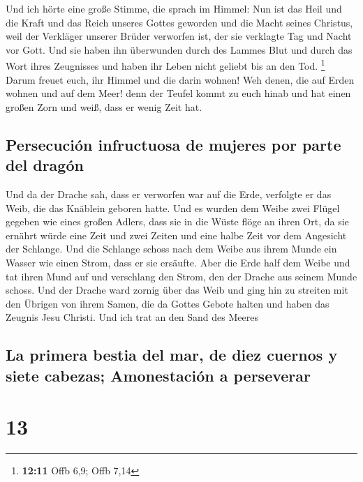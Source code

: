  Und ich hörte eine große Stimme, die sprach im Himmel:
Nun ist das Heil und die Kraft und das Reich unseres Gottes geworden und
die Macht seines Christus, weil der Verkläger unserer Brüder verworfen
ist, der sie verklagte Tag und Nacht vor Gott.  Und sie
haben ihn überwunden durch des Lammes Blut und durch das Wort ihres
Zeugnisses und haben ihr Leben nicht geliebt bis an den Tod. \footnote{\textbf{12:11}
  Offb 6,9; Offb 7,14}  Darum freuet euch, ihr Himmel und
die darin wohnen! Weh denen, die auf Erden wohnen und auf dem Meer! denn
der Teufel kommt zu euch hinab und hat einen großen Zorn und weiß, dass
er wenig Zeit hat.

\hypertarget{persecuciuxf3n-infructuosa-de-mujeres-por-parte-del-draguxf3n}{%
\subsection{Persecución infructuosa de mujeres por parte del
dragón}\label{persecuciuxf3n-infructuosa-de-mujeres-por-parte-del-draguxf3n}}

 Und da der Drache sah, dass er verworfen war auf die
Erde, verfolgte er das Weib, die das Knäblein geboren hatte.
 Und es wurden dem Weibe zwei Flügel gegeben wie eines
großen Adlers, dass sie in die Wüste flöge an ihren Ort, da sie ernährt
würde eine Zeit und zwei Zeiten und eine halbe Zeit vor dem Angesicht
der Schlange.  Und die Schlange schoss nach dem Weibe aus
ihrem Munde ein Wasser wie einen Strom, dass er sie ersäufte.
 Aber die Erde half dem Weibe und tat ihren Mund auf und
verschlang den Strom, den der Drache aus seinem Munde schoss.
 Und der Drache ward zornig über das Weib und ging hin zu
streiten mit den Übrigen von ihrem Samen, die da Gottes Gebote halten
und haben das Zeugnis Jesu Christi.  Und ich trat an den
Sand des Meeres

\hypertarget{la-primera-bestia-del-mar-de-diez-cuernos-y-siete-cabezas-amonestaciuxf3n-a-perseverar}{%
\subsection{La primera bestia del mar, de diez cuernos y siete cabezas;
Amonestación a
perseverar}\label{la-primera-bestia-del-mar-de-diez-cuernos-y-siete-cabezas-amonestaciuxf3n-a-perseverar}}

\hypertarget{section-12}{%
\section{13}\label{section-12}}

